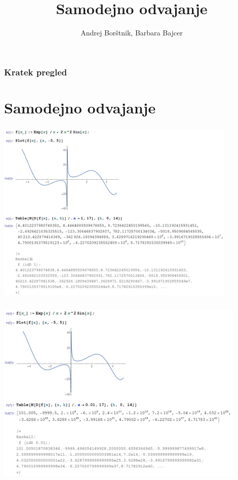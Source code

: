 \documentclass[9pt,table]{beamer}
\begin{document}

\title{Samodejno odvajanje}
\author{Andrej Borštnik, Barbara Bajcer}

\begin{frame}
   \titlepage
\end{frame}


\begin{frame}
   \frametitle{Kratek pregled}
   \tableofcontents[pausesections]
\end{frame}


\section{Samodejno odvajanje}

\begin{frame}
\frametitle{}
\begin{center}
\includegraphics[width=11.5cm]{graf1.png}
\end{center}
\end{frame}

\begin{frame}
\frametitle{}
\begin{center}
\includegraphics[width=12cm]{graf2.png}
\end{center}
\end{frame}
\end{document}
